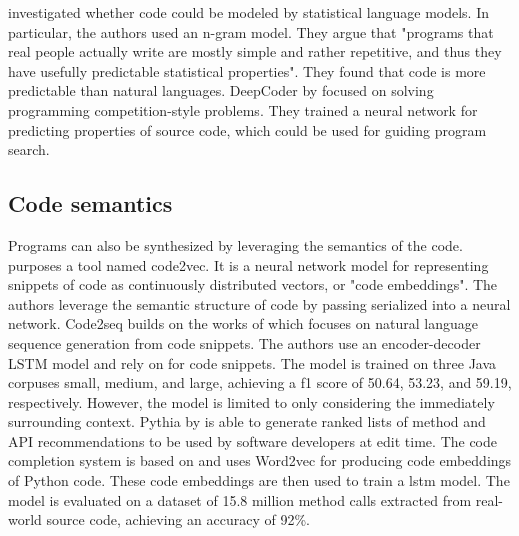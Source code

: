 \textcite{hindle2012natural} investigated whether code could be modeled by statistical language models. In particular, the authors used an n-gram model. They argue that "programs that real people actually write are mostly simple and rather repetitive, and thus they have usefully predictable statistical properties". They found that code is more predictable than natural languages. DeepCoder by \textcite{balog2017deepcoder} focused on solving programming competition-style problems. They trained a neural network for predicting properties of source code, which could be used for guiding program search.

\subsection{Code semantics}
Programs can also be synthesized by leveraging the semantics of the code. \textcite{alon2018code2vec} purposes a tool named code2vec. It is a neural network model for representing snippets of code as continuously distributed vectors, or "code embeddings". The authors leverage the semantic structure of code by passing serialized  into a neural network. Code2seq \cite{alon2018code2seq} builds on the works of \textcite{alon2018code2vec} which focuses on natural language sequence generation from code snippets. The authors use an encoder-decoder LSTM model and rely on  for code snippets. The model is trained on three Java corpuses small, medium, and large, achieving a \gls{f1} score of 50.64, 53.23, and 59.19, respectively. However, the model is limited to only considering the immediately surrounding context. Pythia by \textcite{svyatkovskiy2019pyhia} is able to generate ranked lists of method and API recommendations to be used by software developers at edit time. The code completion system is based on  and uses Word2vec for producing code embeddings of Python code. These code embeddings are then used to train a \gls{lstm} model. The model is evaluated on a dataset of 15.8 million method calls extracted from real-world source code, achieving an accuracy of 92\%.

